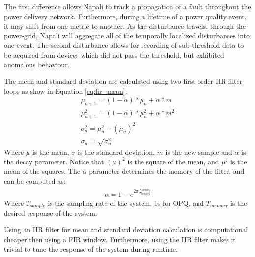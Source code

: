 The first difference allows Napali to track a propagation of a fault throughout the power delivery network.
Furthermore, during a lifetime of a power quality event, it may shift from one metric to another.
As the disturbance travels, through the power-grid, Napali will aggregate all of the temporally localized disturbances into one event.
The second disturbance allows for recording of sub-threshold data to be acquired from devices which did not pass the threshold, but exhibited anomalous behaviour.

The mean and standard deviation are calculated using two first order IIR filter loops as show in Equation \ref{eq:fir_mean}:
\begin{equation}\label{eq:fir_mean}
\begin{aligned}
	\mu_{n+1} = (1- \alpha)*\mu_{n} + \alpha * m \\
	\mu^2_{n+1} = (1- \alpha)*\mu^2_n + \alpha * m^2 \\
	\sigma^2_n = \mu^2_n - (\mu_n)^2 \\
	\sigma_n =\sqrt{\sigma_n^2}
\end{aligned}
\end{equation}
Where $\mu$ is the mean, $\sigma$ is the standard deviation, $m$ is the new sample and $\alpha$ is the decay parameter.
Notice that $(\mu)^2$ is the square of the mean, and $\mu^2$ is the mean of the squares.
The $\alpha$ parameter determines the memory of the filter, and can be computed as:
\begin{equation}\label{eq:fir_alpha}
\begin{aligned}
	\alpha = 1 - e^{2\pi\frac{T_{sample}}{T_{memory}}}
\end{aligned}
\end{equation}
Where $T_{sample}$ is the sampling rate of the system, 1s for OPQ, and $T_{memory}$ is the desired response of the system.

Using an IIR filter for mean and standard deviation calculation is computational cheaper then using a FIR window.
Furthermore, using the IIR filter makes it trivial to tune the response of the system during runtime.

